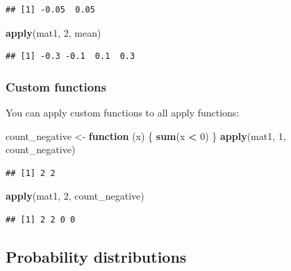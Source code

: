 \documentclass[
  11pt,
]{article}
\newenvironment{Shaded}{\begin{snugshade}}{\end{snugshade}}
\newcommand{\ControlFlowTok}[1]{\textcolor[rgb]{0.13,0.29,0.53}{\textbf{#1}}}
\newcommand{\DecValTok}[1]{\textcolor[rgb]{0.00,0.00,0.81}{#1}}
\newcommand{\FunctionTok}[1]{\textcolor[rgb]{0.13,0.29,0.53}{\textbf{#1}}}
\newcommand{\NormalTok}[1]{#1}
\newcommand{\OtherTok}[1]{\textcolor[rgb]{0.56,0.35,0.01}{#1}}
\newcommand{\SpecialCharTok}[1]{\textcolor[rgb]{0.81,0.36,0.00}{\textbf{#1}}}
\begin{document}
\begin{verbatim}
## [1] -0.05  0.05
\end{verbatim}

\begin{Shaded}
\begin{Highlighting}[]
\FunctionTok{apply}\NormalTok{(mat1, }\DecValTok{2}\NormalTok{, mean)}
\end{Highlighting}
\end{Shaded}

\begin{verbatim}
## [1] -0.3 -0.1  0.1  0.3
\end{verbatim}

\hypertarget{custom-functions}{%
\subsubsection{Custom functions}\label{custom-functions}}

You can apply custom functions to all apply functions:

\begin{Shaded}
\begin{Highlighting}[]
\NormalTok{count\_negative }\OtherTok{\textless{}{-}} \ControlFlowTok{function}\NormalTok{ (x) \{}
  \FunctionTok{sum}\NormalTok{(x }\SpecialCharTok{\textless{}} \DecValTok{0}\NormalTok{)}
\NormalTok{\}}
\FunctionTok{apply}\NormalTok{(mat1, }\DecValTok{1}\NormalTok{, count\_negative)}
\end{Highlighting}
\end{Shaded}

\begin{verbatim}
## [1] 2 2
\end{verbatim}

\begin{Shaded}
\begin{Highlighting}[]
\FunctionTok{apply}\NormalTok{(mat1, }\DecValTok{2}\NormalTok{, count\_negative)}
\end{Highlighting}
\end{Shaded}

\begin{verbatim}
## [1] 2 2 0 0
\end{verbatim}

\hypertarget{probability-distributions}{%
\subsection{Probability distributions}\label{probability-distributions}}
\end{document}
